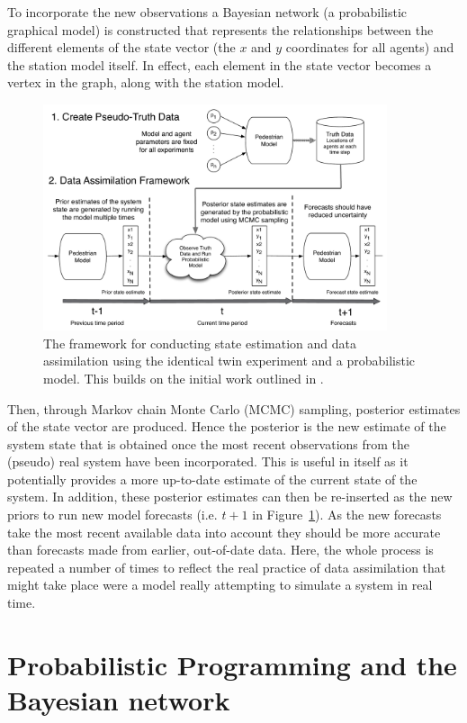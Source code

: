 \documentclass[runningheads]{llncs}
\begin{document}
To incorporate the new observations a Bayesian network (a probabilistic graphical model) is constructed that represents the relationships between the different elements of the state vector (the $x$ and $y$ coordinates for all agents) and the station model itself. In effect, each element in the state vector becomes a vertex in the graph, along with the station model. 

\begin{figure}
	\centering
	\includegraphics[width=0.9\textwidth]{figures/da_framework}
	\caption{The framework for conducting state estimation and data assimilation using the identical twin experiment and a probabilistic model. This builds on the initial work outlined in \cite{malleson_understanding_2018}.} \label{fig:da_framework}
\end{figure}


Then, through Markov chain Monte Carlo (MCMC) sampling, posterior estimates of the state vector are produced.  Hence the posterior is the new estimate of the system state that is obtained once the most recent observations from the (pseudo) real system have been incorporated. This is useful in itself as it potentially provides a more up-to-date estimate of the current state of the system. In addition, these posterior estimates can then be re-inserted as the new priors to run new model forecasts (i.e. $t+1$ in Figure~\ref{fig:da_framework}). As the new forecasts take the most recent available data into account they should be more accurate than forecasts made from earlier, out-of-date data. Here, the whole process is repeated a number of times to reflect the real practice of data assimilation that might take place were a model really attempting to simulate a system in real time.

\section{Probabilistic Programming and the Bayesian network}
\end{document}
